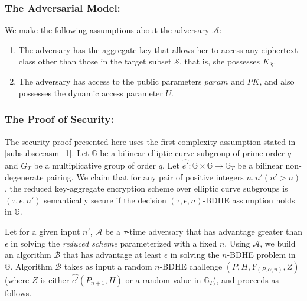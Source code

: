\subsubsection{The Adversarial Model:} We make the following assumptions about the adversary $\mathcal{A}$:

\begin{enumerate}
 \item The adversary has the aggregate key that allows her to access any ciphertext class other than those in the target subset $\mathcal{S}$, that is, she possesses $K_{\overline{\mathcal{S}}}$.
 \item The adversary has access to the public parameters $param$ and $PK$, and also possesses the dynamic access parameter $U$.
 
\end{enumerate}

\subsubsection{The Proof of Security:}

The security proof presented here uses the first complexity assumption stated in \ref{subsubsec:asm_1}. Let $\mathbb{G}$ be a bilinear elliptic curve subgroup of prime order $q$ and $G_T$ be a multiplicative group of order $q$. Let $\hat{e'}:\mathbb{G}\times \mathbb{G}\longrightarrow\mathbb{G}_T$ be a bilinear non-degenerate pairing. We claim that for any pair of positive integers $n,n' (n'>n)$, the reduced key-aggregate encryption scheme over elliptic curve subgroups is $(\tau,\epsilon,n')$ semantically secure if the decision $(\tau,\epsilon,n)$-BDHE assumption holds in $\mathbb{G}$.

\textbf{} Let for a given input $n'$, $\mathcal{A}$ be a $\tau$-time adversary that has advantage greater than $\epsilon$ in solving the \emph{reduced scheme} parameterized with a fixed $n$. Using $\mathcal{A}$, we build an algorithm $\mathcal{B}$ that has advantage at least $\epsilon$ in solving the $n$-BDHE problem in $\mathbb{G}$. Algorithm $\mathcal{B}$ takes as input a random $n$-BDHE challenge $(P,H,Y_{(P,\alpha,n)},Z)$ (where $Z$ is either $\hat{e'}(P_{n+1},H)$ or a random value in $\mathbb{G}_T$), and proceeds as follows.

